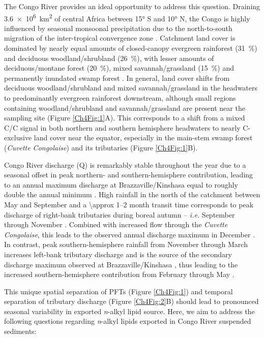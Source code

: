 The Congo River provides an ideal opportunity to address this question. Draining \SI{3.6e6}{km^{2}} of central Africa between \ang{15} S and \ang{10} N, the Congo is highly influenced by seasonal monsoonal precipitation due to the north-to-south migration of the inter-tropical convergence zone \citep[ITCZ;][]{Gasse:2000ul}. Catchment land cover is dominated by nearly equal amounts of closed-canopy evergreen rainforest (\SI{31}{\%}) and deciduous woodland/shrubland (\SI{26}{\%}), with lesser amounts of deciduous/montane forest (\SI{20}{\%}), mixed savannah/grassland (\SI{15}{\%}) and permanently inundated swamp forest \citep[\SI{4}{\%};][]{Mayaux:2004uw,Still:2010wh}. In general, land cover shifts from deciduous woodland/shrubland and mixed savannah/grassland in the headwaters to predominantly evergreen rainforest downstream, although small regions containing woodland/shrubland and savannah/grassland are present near the sampling site (Figure \ref{Ch4Fig:1}A). This corresponds to a shift from a mixed C/C signal in both northern and southern hemisphere headwaters to nearly C-exclusive land cover near the equator, especially in the main-stem swamp forest (\textit{Cuvette Congolaise}) and its tributaries (Figure \ref{Ch4Fig:1}B).

Congo River discharge (Q) is remarkably stable throughout the year due to a seasonal offset in peak northern- and southern-hemisphere contribution, leading to an annual maximum discharge at Brazzaville/Kinshasa equal to roughly double the annual minimum \citep{Coynel:2005cn,Spencer:2014vp}. High rainfall in the north of the catchment between May and September and a \numrange{\approx 1}{2} month transit time corresponds to peak discharge of right-bank tributaries during boreal autumn -- \textit{i.e.} September through November \citep{Bricquet:1993ve,Mahe:1993wu}. Combined with increased flow through the \textit{Cuvette Congolaise}, this leads to the observed annual discharge maximum in December \citep[Figure \ref{Ch4Fig:2}A;][]{Bricquet:1993ve}. In contrast, peak southern-hemisphere rainfall from November through March increases left-bank tributary discharge and is the source of the secondary discharge maximum observed at Brazzaville/Kinshasa \citep[Figure \ref{Ch4Fig:2}A;][]{Bricquet:1993ve,Mahe:1993wu}, thus leading to the increased southern-hemisphere contribution from February through May \citep[Figure \ref{Ch4Fig:2}B;][]{Bricquet:1993ve}.

This unique spatial separation of PFTs (Figure \ref{Ch4Fig:1}) and temporal separation of tributary discharge (Figure \ref{Ch4Fig:2}B) should lead to pronounced seasonal variability in exported \textit{n}-alkyl lipid source. Here, we aim to address the following questions regarding \textit{n}-alkyl lipids exported in Congo River suspended sediments: 

